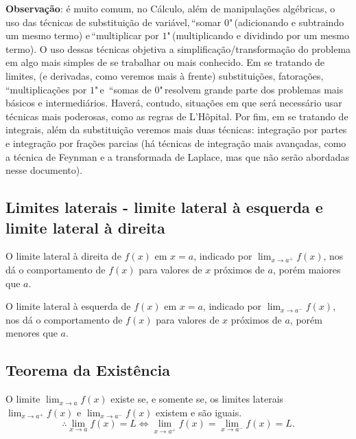 \documentclass{article}
\begin{document}
{\begin{newpage}
\textbf{Observação}: é muito comum, no Cálculo, além de manipulações algébricas, o uso das técnicas de substituição de variável,$\,$\textquotedblleft somar $0$"$\,$(adicionando e subtraindo um mesmo termo) e$\,$\textquotedblleft multiplicar por $1$"$\,$(multiplicando e dividindo por um mesmo termo). O uso dessas técnicas objetiva a simplificação/transformação do problema em algo mais simples de se trabalhar ou mais conhecido. Em se tratando de limites, (e derivadas, como veremos mais à frente) substituições, fatorações,$\,$\textquotedblleft multiplicações por $1$"$\,$e$\,$ \textquotedblleft somas de $0$"$\,$resolvem grande parte dos problemas mais básicos e intermediários. Haverá, contudo, situações em que será necessário usar técnicas mais poderosas, como as regras de L'Hôpital. Por fim, em se tratando de integrais, além da substituição veremos mais duas técnicas: integração por partes e integração por frações parcias (há técnicas de integração mais avançadas, como a técnica de Feynman e a transformada de Laplace, mas que não serão abordadas nesse documento).
\vspace{0.3cm}
\subsection{Limites laterais - limite lateral à esquerda e limite lateral à direita}
\par\hspace{12pt} O limite lateral à direita de $f(x)$ em $x=a$, indicado por $\displaystyle{\lim_{x\to a^{+}} f(x)}$, nos dá o comportamento de $f(x)$ para valores de $x$ próximos de $a$, porém maiores que $a$.
\par O limite lateral à esquerda de $f(x)$ em $x=a$, indicado por $\displaystyle{\lim_{x\to a^{-}} f(x)}$, nos dá o comportamento de $f(x)$ para valores de $x$ próximos de $a$, porém menores que $a$.
\vspace{0.3cm}
\subsection{Teorema da Existência}
\par\hspace{12pt} O limite $\displaystyle{\lim_{x\to a} f(x)}$ existe se, e somente se, os limites laterais $\displaystyle{\lim_{x\to a^{+}} f(x)}$ e $\displaystyle{\lim_{x\to a^{-}} f(x)}$ existem e são iguais.
\begin{equation*} \therefore \lim_{x\to a} f(x) = L \Leftrightarrow \lim_{x\to a^{+}} f(x) = \lim_{x\to a^{-}} f(x) = L. \end{equation*}
\vspace{0.3cm}

\end{newpage}}
\end{document}
